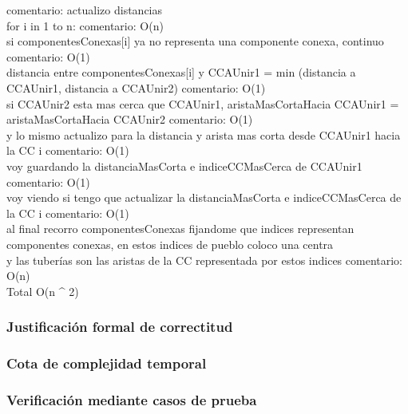 \documentclass[11pt, a4paper, twoside]{article}
\begin{document}
    comentario: actualizo distancias \\
    for i in 1 to n:  comentario: O(n)\\
        si componentesConexas[i] ya no representa una componente conexa, continuo comentario: O(1) \\
        distancia entre componentesConexas[i] y CCAUnir1 = min (distancia a CCAUnir1, distancia a CCAUnir2) comentario: O(1) \\
        si CCAUnir2 esta mas cerca que CCAUnir1, aristaMasCortaHacia CCAUnir1 = aristaMasCortaHacia CCAUnir2 comentario: O(1) \\
        y lo mismo actualizo para la distancia y arista mas corta desde CCAUnir1 hacia la CC i comentario: O(1) \\
        voy guardando la distanciaMasCorta e indiceCCMasCerca de CCAUnir1 comentario: O(1) \\
        voy viendo si tengo que actualizar la distanciaMasCorta e indiceCCMasCerca de la CC i comentario: O(1)\\

al final recorro componentesConexas fijandome que indices representan componentes conexas, en estos indices de pueblo coloco una centra \\
y las tuberías son las aristas de la CC representada por estos indices comentario: O(n) \\
    
Total O(n ^ 2) \\


\subsubsection{Justificación formal de correctitud}

\subsubsection{Cota de complejidad temporal}

\subsubsection{Verificación mediante casos de prueba}
\end{document}
